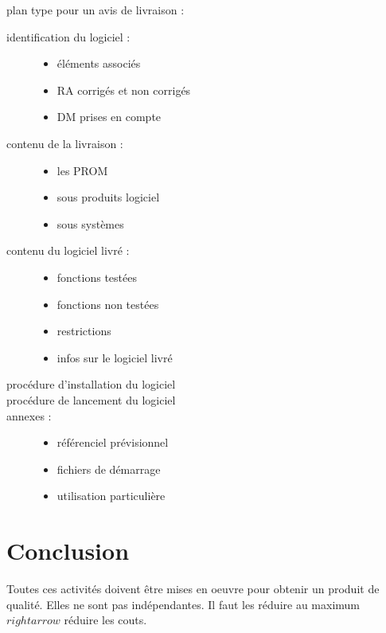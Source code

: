 plan type pour un avis de livraison :
\begin{description}
\item[identification du logiciel :]
	\begin{itemize}
	\item éléments associés
	\item RA corrigés et non corrigés
	\item DM prises en compte
	\end{itemize}

\item[contenu de la livraison :]
	\begin{itemize}
	\item les PROM
	\item sous produits logiciel
	\item sous systèmes
	\end{itemize}

\item[contenu du logiciel livré :]
	\begin{itemize}
	\item fonctions testées
	\item fonctions non testées
	\item restrictions
	\item infos sur le logiciel livré
	\end{itemize}

\item[procédure d’installation du logiciel]

\item[procédure de lancement du logiciel]

\item[annexes :]
	\begin{itemize}
	\item référenciel prévisionnel
	\item fichiers de démarrage
	\item utilisation particulière
	\end{itemize}

\end{description}

\section{Conclusion}

Toutes ces activités doivent être mises en oeuvre pour obtenir un produit de qualité. Elles ne sont pas indépendantes. Il faut les réduire au maximum $
rightarrow$ réduire les couts.
